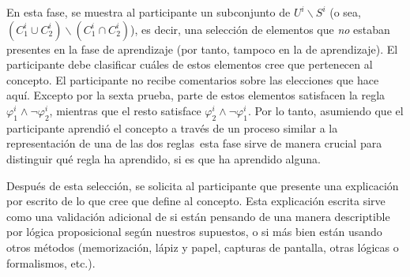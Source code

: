 En esta fase, se muestra al participante un subconjunto de $U^i \backslash S^i $ (o sea, $(C^i_1 \cup C^i_2) \backslash (C^i_1 \cap C^i_2) $), es decir, una selección de elementos que \emph {no} estaban presentes en la fase de aprendizaje (por tanto, tampoco en la de aprendizaje). El participante debe clasificar cuáles de estos elementos cree que pertenecen al concepto. El participante no recibe comentarios sobre las elecciones que hace aquí. Excepto por la sexta prueba, parte de estos elementos satisfacen la regla $\varphi^i_1 \land \lnot \varphi^i_2$, mientras que el resto satisface $\varphi^i_2 \land \lnot \varphi^i_1$. Por lo tanto, \textemdash asumiendo que el participante aprendió el concepto a través de un proceso similar a la representación de una de las dos reglas\textemdash\, esta fase sirve de manera crucial para distinguir qué regla ha aprendido, si es que ha aprendido alguna.

Después de esta selección, se solicita al participante que presente una explicación por escrito de lo que cree que define al concepto. Esta explicación escrita sirve como una validación adicional de si están pensando de una manera descriptible por lógica proposicional según nuestros supuestos, o si más bien están usando otros métodos (memorización, lápiz y papel, capturas de pantalla, otras lógicas o formalismos, etc.).

